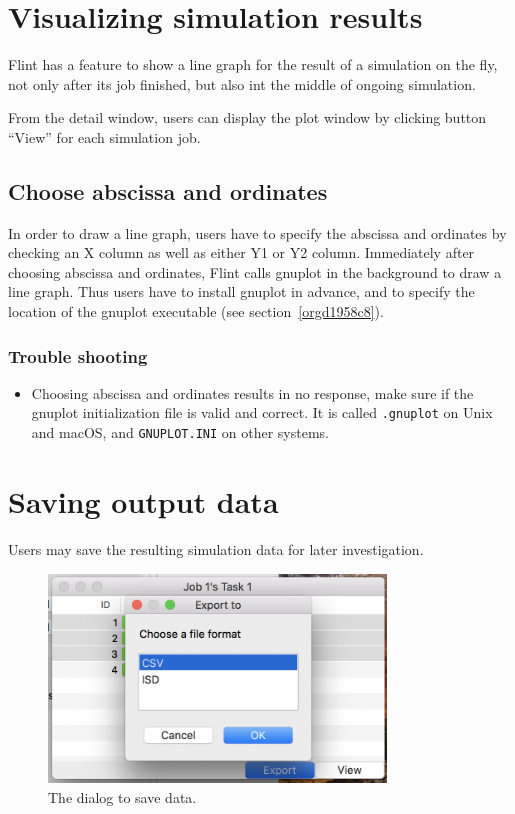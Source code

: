 \documentclass[a4paper,10pt]{report}
\begin{document}
\section{Visualizing simulation results}
\label{sec:org4b0e4f2}
Flint has a feature to show a line graph for the result of a simulation on the
fly, not only after its job finished, but also int the middle of ongoing
simulation.

From the detail window, users can display the plot window by clicking button
``View'' for each simulation job.

\subsection{Choose abscissa and ordinates}
\label{sec:org22582e2}
In order to draw a line graph, users have to specify the abscissa and ordinates
by checking an X column as well as either Y1 or Y2 column.
Immediately after choosing abscissa and ordinates, Flint calls gnuplot in the
background to draw a line graph.
Thus users have to install gnuplot in advance, and to specify the location of
the gnuplot executable (see section~\ref{orgd1958c8}).

\subsubsection{Trouble shooting}
\label{sec:org5a926a0}

\begin{itemize}
\item Choosing abscissa and ordinates results in no response, make sure if the
gnuplot initialization file is valid and correct.
It is called \texttt{.gnuplot} on Unix and macOS, and \texttt{GNUPLOT.INI} on
other systems.
\end{itemize}


\section{Saving output data}
\label{sec:orgdfd1220}
Users may save the resulting simulation data for later investigation.

\begin{figure}[htbp]
\centering
\includegraphics[width=0.8\textwidth]{image/lr-export.png}
\caption{\label{fig:org1876dfe}The dialog to save data.}
\end{figure}
\end{document}
